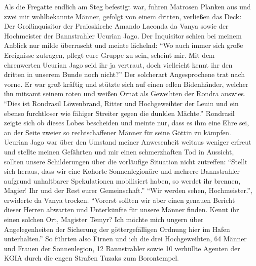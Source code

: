 Als die Fregatte endlich am Steg befestigt war, fuhren Matrosen Planken aus und zwei mir wohlbekannte Männer, gefolgt von einem dritten, verließen das Deck: Der Großinquisitor der Praioskirche Amando Laconda da Vanya sowie der Hochmeister der Bannstrahler Ucurian Jago. Der Inquisitor schien bei meinem Anblick nur milde überrascht und meinte lächelnd: ``Wo auch immer sich große Ereignisse zutragen, pflegt eure Gruppe zu sein, scheint mir. Mit dem ehrenwerten Ucurian Jago seid ihr ja vertraut, doch vielleicht kennt ihr den dritten in unserem Bunde noch nicht?'' Der solcherart Angesprochene trat nach vorne. Er war groß kräftig und stützte sich auf einen edlen Bidenhänder, welcher ihn mitsamt seinem roten und weißen Ornat als Geweihten der Rondra auswies. ``Dies ist Rondrasil Löwenbrand, Ritter und Hochgeweihter der Leuin und ein ebenso furchtloser wie fähiger Streiter gegen die dunklen Mächte.'' Rondrasil zeigte sich ob dieses Lobes bescheiden und meinte nur, dass es ihm eine Ehre sei, an der Seite zweier so rechtschaffener Männer für seine Göttin zu kämpfen. Ucurian Jago war über den Umstand meiner Anwesenheit weitaus weniger erfreut und stellte meinen Gefährten und mir einen schmerzhaften Tod in Aussicht, sollten unsere Schilderungen über die vorläufige Situation nicht zutreffen: ``Stellt sich heraus, dass wir eine Kohorte Sonnenlegionäre und mehrere Bannstrahler aufgrund unhaltbarer Spekulationen mobilisiert haben, so werdet ihr brennen, Magier! Ihr und der Rest eurer Gemeinschaft.'' ``Wir werden sehen, Hochmeister.'', erwiderte da Vanya trocken. ``Vorerst sollten wir aber einen genauen Bericht dieser Herren abwarten und Unterkünfte für unsere Männer finden. Kennt ihr einen solchen Ort, Magister Temyr? Ich möchte mich ungern über Angelegenheiten der Sicherung der göttergefälligen Ordnung hier im Hafen unterhalten.'' So führten also Firnen und ich die drei Hochgeweihten, 64 Männer und Frauen der Sonnenlegion, 12 Bannstrahler sowie 10 verhüllte Agenten der KGIA durch die engen Straßen Tuzaks zum Borontempel.

